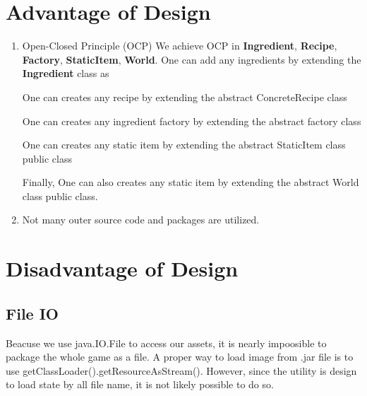 



\newpage
\section{Advantage of Design}
\begin{enumerate}
\item Open-Closed Principle (OCP)
    We achieve OCP in \textbf{Ingredient}, \textbf{Recipe}, \textbf{Factory}, \textbf{StaticItem}, \textbf{World}.
    One can add any ingredients by extending the \textbf{Ingredient} class as


One can creates any recipe by extending the abstract ConcreteRecipe class


One can creates any ingredient factory by extending the abstract factory class


One can creates any static item by extending the abstract StaticItem class public class


Finally, One can also creates any static item by extending the abstract World class public class.
\item Not many outer source code and packages are utilized.
\end{enumerate}

\section{Disadvantage of Design}
\subsection{File IO}
Beacuse we use java.IO.File to access our assets, it is nearly impoosible to package the whole game as a file.
A proper way to load image from .jar file is to use getClassLoader().getResourceAsStream(). However, since the utility is design to load state by
all file name, it is not likely possible to do so.
